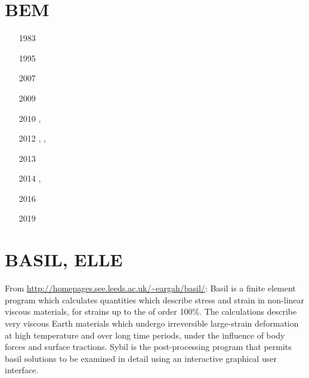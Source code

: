 
\section{BEM} 

\begin{small}
\begin{itemize}
\item[1983] \textcite{crsr83}
\item[1995] \textcite{katl95}
\item[2007] \textcite{moct07}
\item[2009] \textcite{moct09}
\item[2010] \textcite{moyb10}, \textcite{ribe10}
\item[2012] \textcite{qumm12}, \textcite{buqm12}, \textcite{liri12}
\item[2013] \textcite{quhm13}
\item[2014] \textcite{diwl14}, \textcite{lidr14}
\item[2016] \textcite{xuri16}
\item[2019] \textcite{gert19}
\end{itemize}
\end{small}

\section{BASIL, ELLE} 

From \url{http://homepages.see.leeds.ac.uk/~eargah/basil/}:
Basil is a finite element program which calculates quantities which describe  stress 
and strain in non-linear viscous materials, for strains up to the of order 100\%.   
The calculations  describe  very  viscous  Earth materials which undergo irreversible large-strain 
deformation at  high  temperature  and over long time periods, under the influence of body 
forces and surface tractions.  Sybil  is the post-processing program that permits basil 
solutions to be examined in detail using an interactive graphical user interface.

